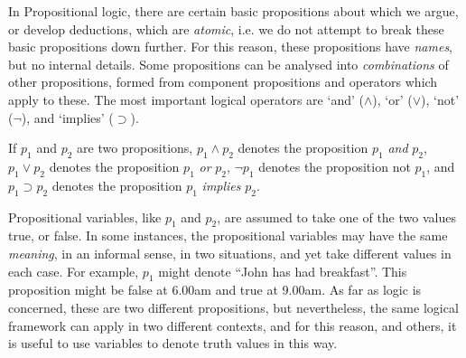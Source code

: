 In Propositional logic, there are certain basic propositions about which we argue, or develop deductions, 
which are {\em atomic}, i.e. we do not attempt to break these basic propositions down further. For this reason,
these propositions have {\em names}, but no internal details. Some propositions can be analysed into {\em combinations}
of other propositions, formed from component propositions and operators which apply to these. The most important
logical operators are `and' ($\wedge$), `or' ($\vee$), `not' ($\neg$), and `implies' ($\supset$).

If $p_1$ and $p_2$ are two propositions, $p_1\wedge p_2$ denotes the proposition $p_1$ {\em and} $p_2$,
$p_1 \vee p_2$ denotes the proposition $p_1$ {\em or} $p_2$, 
$\neg p_1$ denotes the proposition not $p_1$, and $p_1 \supset p_2$ denotes
the proposition $p_1$ {\em implies} $p_2$.

Propositional variables, like $p_1$ and $p_2$, are assumed to take one of the two values true, or false.
In some instances, the propositional variables may have the same {\em meaning}, in an informal sense,
in two situations, and yet take different values in each case. For example, $p_1$ might denote ``John has
had breakfast''.  This proposition might be false at 6.00am and true at 9.00am. As far as logic is concerned,
these are two different propositions, but nevertheless, the same logical framework can apply in two
different contexts, and for this reason, and others, it is useful to use variables to denote truth values in this way.


